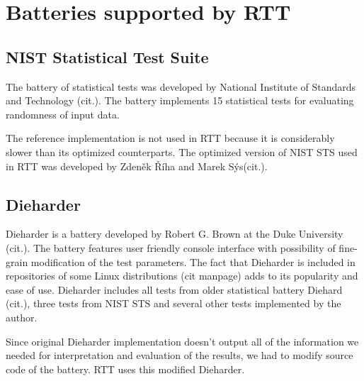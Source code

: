 \documentclass[
  digital,  	%
  color,		%
  oneside,   	%
  12pt,
  nocover,
  notable,
  nolof,
  nolot,
]{fithesis3}
\begin{document}
\section{Batteries supported by RTT}
\subsection{NIST Statistical Test Suite}
The battery of statistical tests was developed by National Institute of Standards and Technology (cit.). The battery implements 15 statistical tests for evaluating randomness of input data.

The reference implementation is not used in RTT because it is considerably slower than its optimized counterparts. The optimized version of NIST STS used in RTT was developed by Zdeněk Říha and Marek Sýs(cit.). 

\subsection{Dieharder}
Dieharder is a battery developed by Robert G. Brown at the Duke University (cit.). The battery features user friendly console interface with possibility of fine-grain modification of the test parameters. The fact that Dieharder is included in repositories of some Linux distributions (cit manpage) adds to its popularity and ease of use. Dieharder includes all tests from older statistical battery Diehard (cit.), three tests from NIST STS and several other tests implemented by the author. 

Since original Dieharder implementation doesn't output all of the information we needed for interpretation and evaluation of the results, we had to modify source code of the battery. RTT uses this modified Dieharder.
\end{document}
